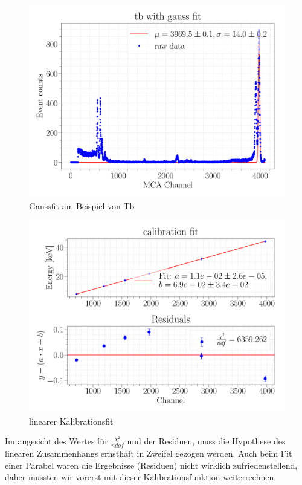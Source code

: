 \documentclass[a4paper,14pt]{article}
\begin{document}
\begin{figure}[H]
\centering
\includegraphics[width=\textwidth]{../Figures/am_tb_gauss.pdf}
\caption{Gaussfit am Beispiel von Tb}
\label{am_tb_gauss}
\end{figure}

\begin{figure}[H]
\centering
\includegraphics[scale=0.25]{../Figures/am_calibration_fit.pdf}
\caption{linearer Kalibrationsfit}
\label{am_calibration_fit}
\end{figure}

Im angesicht des Wertes für $\frac{\chi^2}{ndof}$ und der Residuen, muss die Hypothese des linearen Zusammenhangs ernsthaft in Zweifel gezogen werden. Auch beim Fit einer Parabel waren die Ergebnisse (Residuen) nicht wirklich zufriedenstellend, daher mussten wir vorerst mit dieser Kalibrationsfunktion weiterrechnen.
\end{document}
